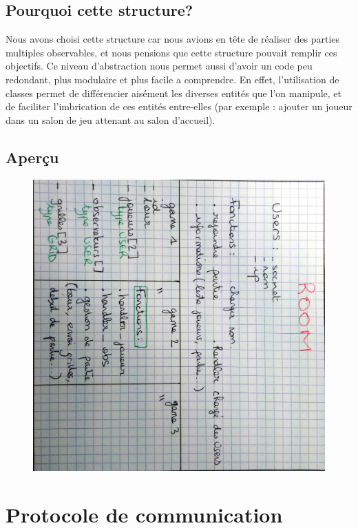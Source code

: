 \documentclass[a4paper]{article}
\begin{document}
\subsection{Pourquoi cette structure?}

Nous avons choisi cette structure car nous avions en tête de réaliser
des parties multiples observables, et nous pensions que cette
structure pouvait remplir ces objectifs. Ce niveau d'abstraction nous
permet aussi d'avoir un code peu redondant, plus modulaire et plus
facile a comprendre. En effet, l'utilisation de classes permet de
différencier aisément les diverses entités que l'on manipule, et de
faciliter l'imbrication de ces entités entre-elles (par exemple :
ajouter un joueur dans un salon de jeu attenant au salon d'accueil).

\newpage
\subsection{Aperçu}

\begin{figure}[h]
\includegraphics[angle=90,width=\textwidth]{Office_Lens_20161223-105104.jpg}
\end{figure}



\section{Protocole de communication}
\end{document}
